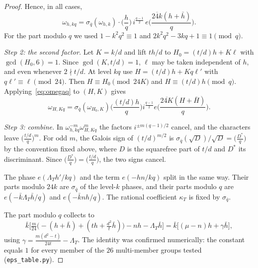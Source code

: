 \documentclass[11pt]{amsart}
\theoremstyle{definition}\newtheorem{definition}[theorem]{Definition}
\theoremstyle{remark}\newtheorem{remark}[theorem]{Remark}
\begin{document}
\begin{proof}
Hence, in all cases,
\begin{equation}\label{eq:omegaq}
\omega_{h,kq}=\sigma_{\bar q}(\omega_{h,k})\cdot\Big(\frac hq\Big)\,i^{\frac{q-1}2}\,e\Big(\frac{\overline{24k}(h+\bar h)}{q}\Big).
\end{equation}
For the part modulo $q$ we used $1-k^2q^2\equiv1$ and $2k^2q^2-3kq+1\equiv1\pmod q$.

\emph{Step 2: the second factor.} Let $K=k/d$ and lift $th/d$ to $H_0=(t/d)h+K\ell$ with $\gcd(H_0,6)=1$. Since $\gcd(K,t/d)=1$, $\ell$ may be taken independent of $h$, and even whenever $2\nmid t/d$. At level $kq$ use $H=(t/d)h+Kq\ell'$ with $q\ell'\equiv\ell\pmod{24}$. Then $H\equiv H_0\pmod{24K}$ and $H\equiv(t/d)h\pmod q$. Applying~\eqref{eq:omegaq} to $(H,K)$ gives
\[
\omega_{H,Kq}=\sigma_{\bar q}(\omega_{H_0,K})\Big(\frac{(t/d)h}{q}\Big)i^{\frac{q-1}2}e\Big(\frac{\overline{24K}(H+\bar H)}{q}\Big).
\]

\emph{Step 3: combine.} In $\omega_{h,kq}^{-m}\omega_{H,Kq}^{m}$ the factors $i^{\pm m(q-1)/2}$ cancel, and the characters leave $\big(\frac{t/d}q\big)^m$. For odd $m$, the Galois sign of $(t/d)^{m/2}$ is $\sigma_{\bar q}(\sqrt{D})/\sqrt D=\big(\frac{D^\ast}{q}\big)$ by the convention fixed above, where $D$ is the squarefree part of $t/d$ and $D^\ast$ its discriminant. Since $\big(\frac{D^\ast}q\big)=\big(\frac{t/d}q\big)$, the two signs cancel.

The phase $e(\Lambda_Th'/kq)$ and the term $e(-hn/kq)$ split in the same way. Their parts modulo $24k$ are $\sigma_{\bar q}$ of the level-$k$ phases, and their parts modulo $q$ are $e(-\bar k\Lambda_T\bar h/q)$ and $e(-\bar knh/q)$. The rational coefficient $\kappa_T$ is fixed by $\sigma_{\bar q}$.

The part modulo $q$ collects to
\[
\bar k\Big[\tfrac{m}{24}\big(-(h+\bar h)+(t h+\tfrac{d^2}t\bar h)\big)-nh-\Lambda_T\bar h\Big]=\bar k\big[(\mu-n)h+\gamma\bar h\big],
\]
using $\gamma=\frac{m(d^2-t)}{24t}-\Lambda_T$. The identity was confirmed numerically: the constant equals $1$ for every member of the $26$ multi-member groups tested (\texttt{eps\_table.py}).
\end{proof}
\end{document}
